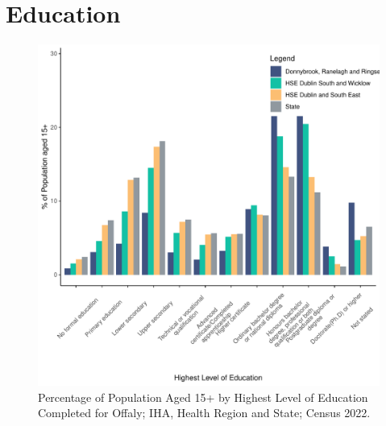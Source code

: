 \documentclass{article}
\begin{document}
\section{Education}\label{sect:Edu}
\begin{figure}[H]
	\centering
	\includegraphics[width = 120mm]{../figures/EduED.pdf}
	\caption{Percentage of Population Aged 15+ by Highest Level of Education Completed for Offaly; IHA, Health Region and State; Census 2022.}
	\label{fig:vbnv}
	\end{figure}
\end{document}
